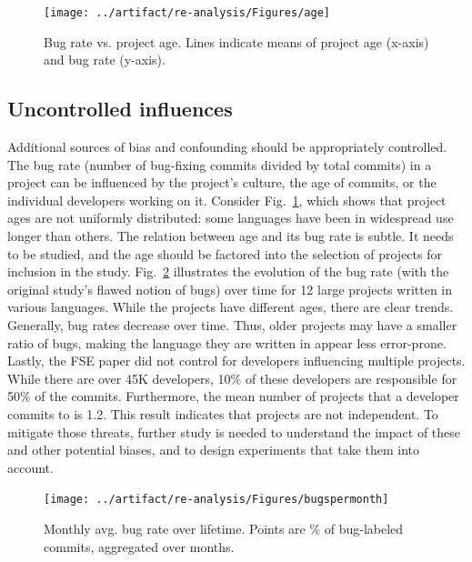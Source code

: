 \documentclass[acmsmall]{acmart}
\begin{document}
\begin{figure}[!h]\texttt{[image: ../artifact/re-analysis/Figures/age]}
\vspace{-3mm}
\caption{Bug rate vs. project age. Lines indicate means of project age
  (x-axis) and bug rate (y-axis).}\label{age}
\end{figure}

\subsection{Uncontrolled influences} 

Additional sources of bias and confounding should be appropriately
controlled. The bug rate (number of bug-fixing commits divided by total
commits) in a project can be influenced by the project's culture, the age of
commits, or the individual developers working on it.  Consider
Fig.~\ref{age}, which shows that project ages are not uniformly distributed:
some languages have been in widespread use longer than others.  The relation
between age and its bug rate is subtle. It needs to be studied, and the age
should be factored into the selection of projects for inclusion in the
study. Fig.~\ref{evolution} illustrates the evolution of the bug rate (with
the original study's flawed notion of bugs) over time for 12 large projects
written in various languages. While the projects have different ages, there
are clear trends. Generally, bug rates decrease over time. Thus, older
projects may have a smaller ratio of bugs, making the language they are
written in appear less error-prone. Lastly, the FSE paper did not control
for developers influencing multiple projects. While there are over 45K
developers, 10\% of these developers are responsible for 50\% of the
commits.  Furthermore, the mean number of projects that a developer commits
to is 1.2. This result indicates that projects are not independent. To
mitigate those threats, further study is needed to understand the impact of
these and other potential biases, and to design experiments that take them
into account.

\begin{figure}[!h]
\texttt{[image: ../artifact/re-analysis/Figures/bugspermonth]}
\vspace{-3mm}
\caption{Monthly avg. bug rate over lifetime. Points are
 \% of bug-labeled commits, aggregated over months.}\label{evolution}
\end{figure}
\end{document}
